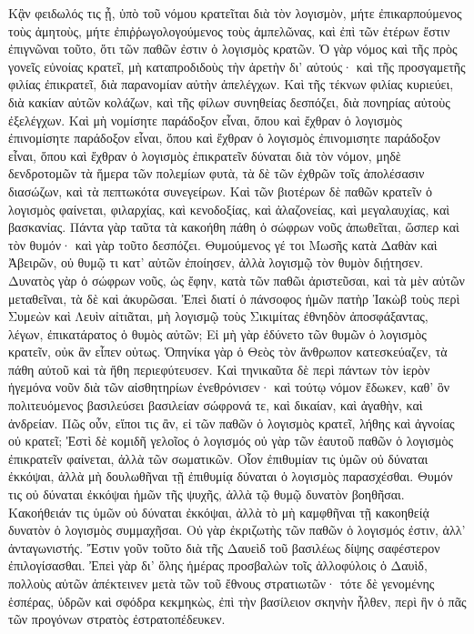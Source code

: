 Κᾂν φειδωλός τις ᾖ, ὑπὸ τοῦ νόμου κρατεῖται διὰ τὸν λογισμὸν, μήτε ἐπικαρπούμενος τοὺς ἀμητοὺς, μήτε ἐπιῤῥωγολογούμενος τοὺς ἀμπελῶνας, καὶ ἐπὶ τῶν ἐτέρων ἔστιν ἐπιγνῶναι τοῦτο, ὅτι τῶν παθῶν ἐστιν ὁ λογισμὸς κρατῶν. 
Ὁ γὰρ νόμος καὶ τῆς πρὸς γονεῖς εὐνοίας κρατεῖ, μὴ καταπροδιδοὺς τὴν ἀρετὴν δι' αὐτούς· 
καὶ τῆς προσγαμετῆς φιλίας ἐπικρατεῖ, διὰ παρανομίαν αὐτὴν ἀπελέγχων. 
Καὶ τῆς τέκνων φιλίας κυριεύει, διὰ κακίαν αὐτῶν κολάζων, καὶ τῆς φίλων συνηθείας δεσπόζει, διὰ πονηρίας αὐτοὺς ἐξελέγχων. 
Καὶ μὴ νομίσητε παράδοξον εἶναι, ὅπου καὶ ἔχθραν ὁ λογισμὸς ἐπινομίσητε παράδοξον εἶναι, ὅπου καὶ ἔχθραν ὁ λογισμὸς ἐπινομισητε παράδοξον εἶναι, ὅπου καὶ ἔχθραν ὁ λογισμὸς ἐπικρατεῖν δύναται διὰ τὸν νόμον, 
μηδὲ δενδροτομῶν τὰ ἥμερα τῶν πολεμίων φυτὰ, τὰ δὲ τῶν ἐχθρῶν τοῖς ἀπολέσασιν διασώζων, καὶ τὰ πεπτωκότα συνεγείρων. 
Καὶ τῶν βιοτέρων δὲ παθῶν κρατεῖν ὁ λογισμὸς φαίνεται, φιλαρχίας, καὶ κενοδοξίας, καὶ ἀλαζονείας, καὶ μεγαλαυχίας, καὶ βασκανίας. 
Πάντα γὰρ ταῦτα τὰ κακοήθη πάθη ὁ σώφρων νοῦς ἀπωθεῖται, ὥσπερ καὶ τὸν θυμόν· καὶ γὰρ τοῦτο δεσπόζει. 
Θυμούμενος γέ τοι Μωσῆς κατὰ Δαθὰν καὶ Ἀβειρῶν, οὐ θυμῷ τι κατ' αὐτῶν ἐποίησεν, ἀλλὰ λογισμῷ τὸν θυμὸν διῄτησεν. 
Δυνατὸς γὰρ ὁ σώφρων νοῦς, ὡς ἔφην, κατὰ τῶν παθῶι ἀριστεῦσαι, καὶ τὰ μὲν αὐτῶν μεταθεῖναι, τὰ δὲ καὶ ἀκυρῶσαι. 
Ἐπεὶ διατί ὁ πάνσοφος ἡμῶν πατὴρ Ἰακὼβ τοὺς περὶ Συμεὼν καὶ Λευὶν αἰτιᾶται, μὴ λογισμῷ τοὺς Σικιμίτας ἐθνηδὸν ἀποσφάξαντας, λέγων, ἐπικατάρατος ὁ θυμὸς αὐτῶν; 
Εἰ μὴ γὰρ ἐδύνετο τῶν θυμῶν ὁ λογισμὸς κρατεῖν, οὐκ ἂν εἶπεν οὑτως. 
Ὁπηνίκα γὰρ ὁ Θεὸς τὸν ἄνθρωπον κατεσκεύαζεν, τὰ πάθη αὐτοῦ καὶ τὰ ἤθη περιεφύτευσεν. 
Καὶ τηνικαῦτα δὲ περὶ πάντων τὸν ἱερὸν ἡγεμόνα νοῦν διὰ τῶν αἰσθητηρίων ἐνεθρόνισεν· 
καὶ τούτῳ νόμον ἔδωκεν, καθ' ὃν πολιτευόμενος βασιλεύσει βασιλείαν σώφρονά τε, καὶ δικαίαν, καὶ ἀγαθὴν, καὶ ἀνδρείαν. 
Πῶς οὖν, εἴποι τις ἂν, εἰ τῶν παθῶν ὁ λογισμὸς κρατεῖ, λήθης καὶ ἀγνοίας οὐ κρατεῖ; 
Ἐστὶ δὲ κομιδῆ γελοῖος ὁ λογισμός οὐ γὰρ τῶν ἑαυτοῦ παθῶν ὁ λογισμὸς ἐπικρατεῖν φαίνεται, ἀλλὰ τῶν σωματικῶν. 
Οἷον ἐπιθυμίαν τις ὑμῶν οὐ δύναται ἐκκόψαι, ἀλλὰ μὴ δουλωθῆναι τῇ ἐπιθυμίᾳ δύναται ὁ λογισμὸς παρασχέσθαι. 
Θυμόν τις οὐ δύναται ἐκκόψαι ἡμῶν τῆς ψυχῆς, ἀλλὰ τῷ θυμῷ δυνατὸν βοηθῆσαι. 
Κακοήθειάν τις ὑμῶν οὐ δύναται ἐκκόψαι, ἀλλὰ τὸ μὴ καμφθῆναι τῇ κακοηθείᾀ δυνατὸν ὁ λογισμὸς συμμαχῆσαι. 
Οὐ γὰρ ἐκριζωτὴς τῶν παθῶν ὁ λογισμός ἐστιν, ἀλλ' ἀνταγωνιστής. 
Ἔστιν γοῦν τοῦτο διὰ τῆς Δαυεὶδ τοῦ βασιλέως δίψης σαφέστερον ἐπιλογίσασθαι. 
Ἐπεὶ γὰρ δι' ὅλης ἡμέρας προσβαλὼν τοῖς ἀλλοφύλοις ὁ Δαυὶδ, πολλοὺς αὐτῶν ἀπέκτεινεν μετὰ τῶν τοῦ ἔθνους στρατιωτῶν· 
τότε δὲ γενομένης ἑσπέρας, ὑδρῶν καὶ σφόδρα κεκμηκὼς, ἐπὶ τὴν βασίλειον σκηνὴν ἦλθεν, περὶ ἣν ὁ πᾶς τῶν προγόνων στρατὸς ἐστρατοπέδευκεν. 
